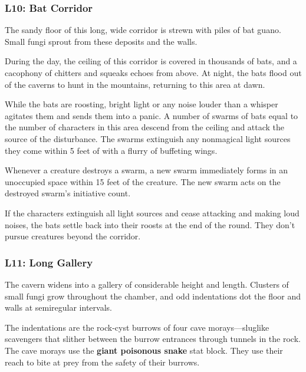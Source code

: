 \documentclass[10pt,a4paper,twoside,bg=print,twocolumn,openany,nodeprecatedcode]{dndbook}
\begin{document}
\subsubsection{L10: Bat Corridor}
\begin{DndReadAloud}{}
The sandy floor of this long, wide corridor is strewn with piles of bat guano. Small fungi sprout from these deposits and the walls.

\end{DndReadAloud}

During the day, the ceiling of this corridor is covered in thousands of bats, and a cacophony of chitters and squeaks echoes from above. At night, the bats flood out of the caverns to hunt in the mountains, returning to this area at dawn.

While the bats are roosting, bright light or any noise louder than a whisper agitates them and sends them into a panic. A number of swarms of bats equal to the number of characters in this area descend from the ceiling and attack the source of the disturbance. The swarms extinguish any nonmagical light sources they come within 5 feet of with a flurry of buffeting wings.

Whenever a creature destroys a swarm, a new swarm immediately forms in an unoccupied space within 15 feet of the creature. The new swarm acts on the destroyed swarm's initiative count.

If the characters extinguish all light sources and cease attacking and making loud noises, the bats settle back into their roosts at the end of the round. They don't pursue creatures beyond the corridor.

\subsubsection{L11: Long Gallery}
\begin{DndReadAloud}{}
The cavern widens into a gallery of considerable height and length. Clusters of small fungi grow throughout the chamber, and odd indentations dot the floor and walls at semiregular intervals.

\end{DndReadAloud}

The indentations are the rock-cyst burrows of four cave morays—sluglike scavengers that slither between the burrow entrances through tunnels in the rock. The cave morays use the \textbf{giant poisonous snake} stat block. They use their reach to bite at prey from the safety of their burrows.
\end{document}
